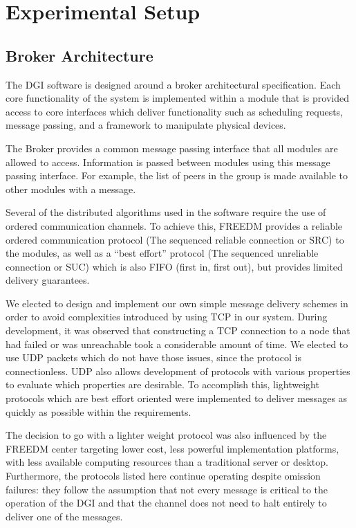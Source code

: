 \section {Experimental Setup}

\subsection{Broker Architecture}
The DGI software is designed around a broker architectural specification.
Each core functionality of the system is implemented within a module that is
provided access to core interfaces which deliver functionality such as
scheduling requests, message passing, and a framework to manipulate physical
devices.

The Broker provides a common message passing interface that all modules are
allowed to access. Information is passed between modules using this message
passing interface. For example, the list of peers in the group is made available
to other modules with a message. 

Several of the distributed algorithms used in the software require the use of
ordered communication channels. To achieve this, FREEDM provides a reliable
ordered communication protocol (The sequenced reliable connection or SRC) to
the modules, as well as a ``best effort'' protocol (The sequenced unreliable
connection or SUC) which is also FIFO (first in, first out), but provides
limited delivery guarantees.

We elected to design and implement our own simple message delivery schemes in
order to avoid complexities introduced by using TCP in our system. During
development, it was observed that constructing a TCP connection to a node that
had failed or was unreachable took a considerable amount of time. We elected to
use UDP packets which do not have those issues, since the protocol is
connectionless. UDP also allows development of protocols with various
properties to evaluate which properties are desirable. To accomplish this,
lightweight protocols which are best effort oriented were implemented to
deliver messages as quickly as possible within the requirements.

The decision to go with a lighter weight protocol was also influenced by the
FREEDM center targeting lower cost, less powerful implementation platforms, with less
available computing resources than a traditional server or desktop.
Furthermore, the protocols listed here continue operating despite omission
failures: they follow the assumption that not every message is critical to the
operation of the DGI and that the channel does not need to halt entirely to
deliver one of the messages.

